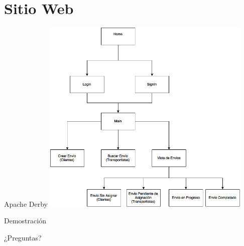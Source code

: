 \documentclass{beamer}
\begin{document}
    \section{Sitio Web}
        \begin{frame}{Apache Derby}
            \centering
            \includegraphics[width=0.75\textwidth]{res/sitemap}
        \end{frame}

        \begin{frame}[standout]
            Demostración
        \end{frame}

    \begin{frame}[standout]
        ¿Preguntas?
    \end{frame}
\end{document}
